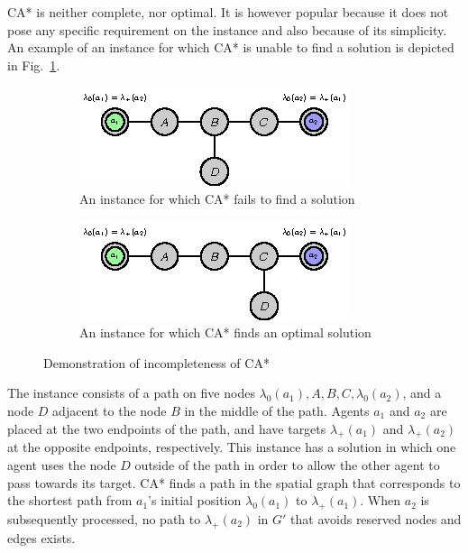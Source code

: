 CA* is neither complete, nor optimal. It is however popular because it does not pose any specific requirement on the instance and also because of its simplicity.
An example of an instance for which CA* is unable to find a solution is depicted in Fig.~\ref{fig:castarfail}.
\begin{figure}
    \centering
    \begin{subfigure}[b]{0.48\textwidth}
	    \includegraphics[scale=2]{figurer/castarfail.eps}
        \caption{An instance for which CA* fails to find a solution}
        \label{fig:castarfail}
    \end{subfigure}\hspace{5mm}
    \begin{subfigure}[b]{0.48\textwidth}
	    \includegraphics[scale=2]{figurer/castarnofail.eps}
        \caption{An instance for which CA* finds an optimal solution}
        \label{fig:castarnofail}
    \end{subfigure}
	\caption{Demonstration of incompleteness of CA*}
\end{figure}
The instance consists of a path on five nodes $\lambda_0(a_1),A,B,C,\lambda_0(a_2)$, and a node $D$ adjacent to the node $B$ in the middle of the path.
Agents $a_1$ and $a_2$ are placed at the two endpoints of the path, and have targets $\lambda_+(a_1)$ and $\lambda_+(a_2)$ at the opposite endpoints, respectively.
This instance has a solution in which one agent uses the node $D$ outside of the path in order to allow the other agent to pass towards its target.
CA* finds a path in the spatial graph that corresponds to the shortest path from $a_1$'s initial position $\lambda_0(a_1)$ to $\lambda_+(a_1)$.
When $a_2$ is subsequently processed, no path to $\lambda_+(a_2)$ in $G'$ that avoids reserved nodes and edges exists.
